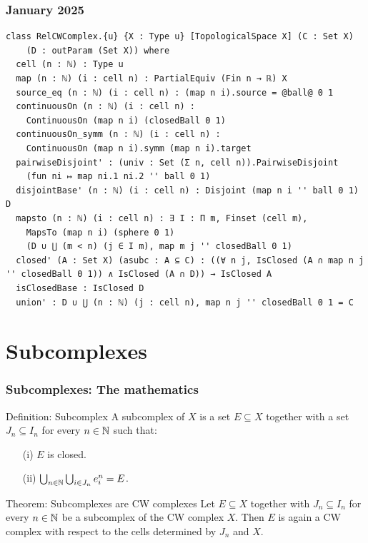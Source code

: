 \documentclass{beamer}
\begin{document}
\begin{frame}[fragile]
\frametitle{January 2025}
\begin{lstlisting}[basicstyle=\ttfamily\scriptsize]
class RelCWComplex.{u} {X : Type u} [TopologicalSpace X] (C : Set X) 
    (D : outParam (Set X)) where
  cell (n : ℕ) : Type u
  map (n : ℕ) (i : cell n) : PartialEquiv (Fin n → ℝ) X
  source_eq (n : ℕ) (i : cell n) : (map n i).source = @ball@ 0 1
  continuousOn (n : ℕ) (i : cell n) : 
    ContinuousOn (map n i) (closedBall 0 1)
  continuousOn_symm (n : ℕ) (i : cell n) : 
    ContinuousOn (map n i).symm (map n i).target
  pairwiseDisjoint' : (univ : Set (Σ n, cell n)).PairwiseDisjoint 
    (fun ni ↦ map ni.1 ni.2 '' ball 0 1)
  disjointBase' (n : ℕ) (i : cell n) : Disjoint (map n i '' ball 0 1) D
  mapsto (n : ℕ) (i : cell n) : ∃ I : Π m, Finset (cell m),
    MapsTo (map n i) (sphere 0 1) 
    (D ∪ ⋃ (m < n) (j ∈ I m), map m j '' closedBall 0 1)
  closed' (A : Set X) (asubc : A ⊆ C) : ((∀ n j, IsClosed (A ∩ map n j '' closedBall 0 1)) ∧ IsClosed (A ∩ D)) → IsClosed A
  isClosedBase : IsClosed D
  union' : D ∪ ⋃ (n : ℕ) (j : cell n), map n j '' closedBall 0 1 = C
\end{lstlisting}

\end{frame}

\section{Subcomplexes}

\begin{frame}
\frametitle{Subcomplexes: The mathematics}
\begin{block}{Definition: Subcomplex}
  A subcomplex of $X$ is a set $E \subseteq X$ together with a set $J_n \subseteq I_n$ for every $n \in \bN$ such that:
    \begin{enumerate}
        \item[(i)] $E$ is closed.
        \item[(ii)] $\bigcup_{n \in \bN} \bigcup_{i \in J_n} \openCell{n}{i} = E$.
    \end{enumerate}
\end{block}
\begin{block}{Theorem: Subcomplexes are CW complexes}
  Let $E \subseteq X$ together with $J_n \subseteq I_n$ for every $n \in \bN$ be a subcomplex of the CW complex $X$. 
  Then $E$ is again a CW complex with respect to the cells determined by $J_n$ and $X$.
\end{block}
\end{frame}
\end{document}

